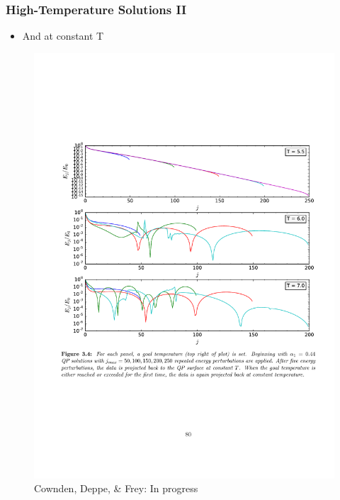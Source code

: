 \documentclass[mathserif,10pt]{beamer}
\newcommand{\bi}{\begin{itemize}}
\newcommand{\ei}{\end{itemize}}
\newcommand{\its}{\item}
\newcommand{\scr}{\scriptsize}
\begin{document}
\frame
{
  \frametitle{High-Temperature Solutions II}
  \bi
  \its And at \alert{constant T}
  \ei
   \begin{figure}
    \centering
    \includegraphics[scale=0.43]{constantTproj} \\ {\scr Cownden, Deppe, \& Frey: In progress}
  \end{figure}
}
\end{document}
